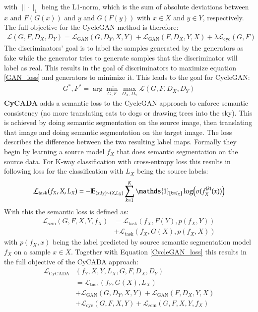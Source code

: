 with $\lVert \cdot \rVert_1$ being the L1-norm, which is the sum of absolute deviations between $x$ and $F(G(x))$ and $y$ and $G(F(y))$ with $x \in X$ and $y \in Y$, respectively. The full objective for the CycleGAN method is therefore:
\begin{align}
	\mathcal{L}(G,F,D_X,D_Y) = \mathcal{L}_{\text{GAN}}(G, D_Y, X, Y) + \mathcal{L}_{\text{GAN}}(F, D_X, Y, X) + \lambda \mathcal{L}_{\text{cyc}}(G, F) \label{CycleGAN_loss}
\end{align}
The discriminators' goal is to label the samples generated by the generators as fake while the generator tries to generate samples that the discriminator will label as real. This results in the goal of discriminators to maximize equation \ref{GAN_loss} and generators to minimize it. This leads to the goal for CycleGAN: 
\begin{align}
	G^*, F^* = \arg \underset{G,F}{\min}\underset{D_X, D_Y}{\max} \mathcal{L}(G,F,D_X,D_Y) \label{GAN_goal}
\end{align}
\textbf{CyCADA} \cite{DBLP:journals/corr/abs-1711-03213} adds a semantic loss to the CycleGAN approach to enforce semantic consistency (no more translating cats to dogs or drawing trees into the sky). This is achieved by doing semantic segmentation on the source image, then translating that image and doing semantic segmentation on the target image. The loss describes the difference between the two resulting label maps. Formally they begin by learning a source model $f_X$ that does semantic segmentation on the source data. For K-way classification with cross-entropy loss this results in following loss for the classification with $L_X$ being the source labels:
\begin{align}
	\mathcal{L}_{\text{task}}(f_X, X, L_X) = -\mathbb{E}_{(x, l_X)\sim(X, L_X)}\sum_{k=1}^{K}\mathds{1}_{[k=l_X]}\log\Bigl(\sigma(f_X^{(k)}(x))\Bigr) \label{task_loss}
\end{align}
With this the semantic loss is defined as:
\begin{align}
	\mathcal{L}_{\text{sem}}(G, F, X, Y, f_X) &= \mathcal{L}_{\text{task}}(f_X, F(Y), p(f_X, Y))\\
	&+ \mathcal{L}_{\text{task}}(f_X, G(X), p(f_X, X))
\end{align}
with $p(f_X, x)$ being the label predicted by source semantic segmentation model $f_X$ on a sample $x \in X$. Together with Equation \ref{CycleGAN_loss} this results in the full objective of the CyCADA approach:
\begin{align}
	\mathcal{L}_{\text{CyCADA}}&(f_Y, X, Y, L_X, G, F, D_X, D_Y)\\
	&= \mathcal{L}_{\text{task}}(f_Y, G(X), L_X)\\
	&+ \mathcal{L}_{\text{GAN}}(G, D_Y, X, Y) + \mathcal{L}_{\text{GAN}}(F, D_X, Y, X)\\
	&+ \mathcal{L}_{\text{cyc}}(G, F, X, Y) + \mathcal{L}_{\text{sem}}(G, F, X, Y, f_X)
\end{align}
